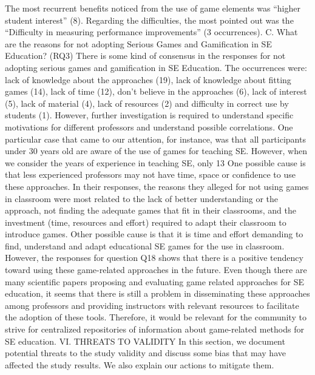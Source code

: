 The most recurrent benefits noticed from the use of game elements was “higher student interest” (8). Regarding the difficulties, the most pointed out was the “Difficulty in measuring performance improvements” (3 occurrences). 
C.	What are the reasons for not adopting Serious Games and Gamification in SE Education? (RQ3)
   There is some kind of consensus in the responses for not adopting serious games and gamification in SE Education. The occurrences were: lack of knowledge about the approaches (19), lack of knowledge about fitting games (14), lack of time (12), don't believe in the approaches (6), lack of interest (5), lack of material (4), lack of resources (2) and difficulty in correct use by students (1). However, further investigation is required to understand specific motivations for different professors and understand possible correlations.
One particular case that came to our attention, for instance, was that all participants under 30 years old are aware of the use of games for teaching SE. However, when we consider the years of experience in teaching SE, only 13%
One possible cause is that less experienced professors may not have time, space or confidence to use these approaches. In their responses, the reasons they alleged for not using games in classroom were most related to the lack of better understanding or the approach, not finding the adequate games that fit in their classrooms, and the investment (time, resources and effort) required to adapt their classroom to introduce games. Other possible cause is that it is time and effort demanding to find, understand and adapt educational SE games for the use in classroom. 
However, the responses for question Q18 shows that there is a positive tendency toward using these game-related approaches in the future. Even though there are many scientific papers proposing and evaluating game related approaches for SE education, it seems that there is still a problem in disseminating these approaches among professors and providing instructors with relevant resources to facilitate the adoption of these tools. Therefore, it would be relevant for the community to strive for centralized repositories of information about game-related methods for SE education.
VI.	THREATS TO VALIDITY
In this section, we document potential threats to the study validity and discuss some bias that may have affected the study results. We also explain our actions to mitigate them.
